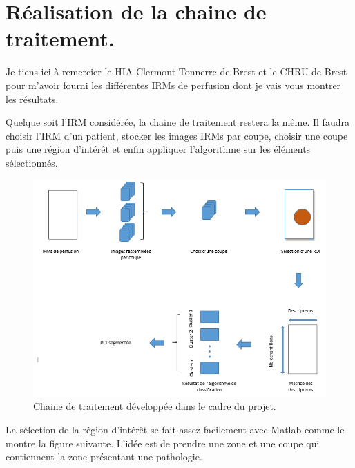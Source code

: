 \chapter{Réalisation de la chaine de traitement.}

Je tiens ici à remercier le HIA Clermont Tonnerre de Brest et le CHRU de Brest pour m'avoir fourni les différentes IRMs de perfusion dont je vais vous montrer les résultats.

Quelque soit l'IRM considérée, la chaine de traitement restera la même. Il faudra choisir l'IRM d'un patient, stocker les images IRMs par coupe, choisir une coupe puis une région d'intérêt et enfin appliquer l'algorithme sur les éléments sélectionnés.

\begin{figure}[H]
\centering
    \includegraphics[scale=0.8,angle=0]{Images/Processing_toolchain.png}
    \caption{Chaine de traitement développée dans le cadre du projet.}
    \label{fig:toolchain}
\end{figure}

La sélection de la région d'intérêt se fait assez facilement avec Matlab comme le montre la figure suivante. L'idée est de prendre une zone et une coupe qui contiennent la zone présentant une pathologie.

